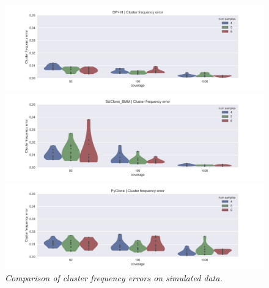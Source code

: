 \documentclass[11pt]{article}
\begin{document}
\begin{figure}[H]
\vspace{-0.25in}
\centerline{\includegraphics[scale=0.75]{DPVI_CFE.png}}
\centerline{\includegraphics[scale=0.75]{SciClone_CFE.png}}
\centerline{\includegraphics[scale=0.75]{PyClone_CFE.png}}
\caption{\emph{Comparison of cluster frequency errors on simulated data.}}
\label{fig:SimCFE}
\end{figure}
\end{document}
